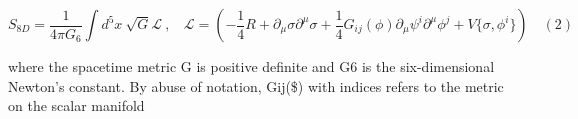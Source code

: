 \documentclass{article}
\begin{document}
\begin{equation}
S _ { 8 D } = \frac { 1 } { 4 \pi G _ { 6 } } \int d ^ { 5 } x ~ \sqrt { G } \mathcal { L } ~, ~ ~ ~ ~ \mathcal { L } = \left ( - \frac { 1 } { 4 } R + \partial _ { \mu } \sigma \partial ^ { \mu } \sigma + \frac { 1 } { 4 } G _ { i j } ( \phi ) \partial _ { \mu } \psi ^ { i } \partial ^ { \mu } \phi ^ { j } + V \{ \sigma, \phi ^ { i } \} \right ) \quad ( 2 )
\end{equation}


where the spacetime metric G is positive definite and G6 is the six-dimensional Newton's
constant. By abuse of notation, Gij(\$) with indices refers to the metric on the scalar manifold
\end{document}
